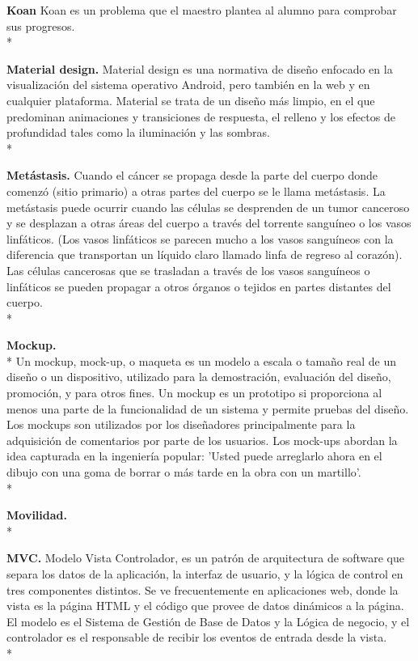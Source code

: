 \documentclass[../pfc.tex]{subfiles}
\begin{document}
	\textbf{Koan}
	Koan es un problema que el maestro plantea al alumno para comprobar sus progresos.\\*
	
	\textbf{Material design.}
	Material design es una normativa de diseño enfocado en la visualización del sistema operativo Android, pero también en la web y en cualquier plataforma.  Material se trata de un diseño más limpio, en el que predominan animaciones y transiciones de respuesta, el relleno y los efectos de profundidad tales como la iluminación y las sombras.\\*
	
	\textbf{Metástasis.}
	Cuando el cáncer se propaga desde la parte del cuerpo donde comenzó (sitio primario) a otras partes del cuerpo se le llama metástasis. La metástasis puede ocurrir cuando las células se desprenden de un tumor canceroso y se desplazan a otras áreas del cuerpo a través del torrente sanguíneo o los vasos linfáticos. (Los vasos linfáticos se parecen mucho a los vasos sanguíneos con la diferencia que transportan un líquido claro llamado linfa de regreso al corazón). Las células cancerosas que se trasladan a través de los vasos sanguíneos o linfáticos se pueden propagar a otros órganos o tejidos en partes distantes del cuerpo.\cite{metastasis}\\*\
	
	\textbf{Mockup.}\\*
	Un mockup, mock-up, o maqueta es un modelo a escala o tamaño real de un diseño o un dispositivo, utilizado para la demostración, evaluación del diseño, promoción, y para otros fines. Un mockup es un prototipo si proporciona al menos una parte de la funcionalidad de un sistema y permite pruebas del diseño.
	Los mockups son utilizados por los diseñadores principalmente para la adquisición de comentarios por parte de los usuarios. Los mock-ups abordan la idea capturada en la ingeniería popular: 'Usted puede arreglarlo ahora en el dibujo con una goma de borrar o más tarde en la obra con un martillo'.\\*
	
	\textbf{Movilidad.}\\*
	
	\textbf{MVC.}
	Modelo Vista Controlador, es un patrón de arquitectura de software que separa los datos de
	la aplicación, la interfaz de usuario, y la lógica de control en tres componentes distintos. Se ve
	frecuentemente en aplicaciones web, donde la vista es la página HTML y el código que provee de
	datos dinámicos a la página. El modelo es el Sistema de Gestión de Base de Datos y la Lógica de
	negocio, y el controlador es el responsable de recibir los eventos de entrada desde la vista.\\*
	
\end{document}

